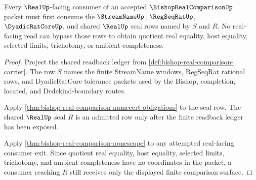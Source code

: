 \begin{theorem}
\label{thm:bishop-real-comparison-seal-exhaustion}
Every $\RealUp$-facing consumer of an accepted $\BishopRealComparisonUp$ packet must first consume the $\StreamNameUp$, $\RegSeqRatUp$, $\DyadicRatCoreUp$, and shared $\RealUp$ seal rows named by $S$ and $R$. No real-facing read can bypass those rows to obtain quotient real equality, host equality, selected limits, trichotomy, or ambient completeness.
\end{theorem}
\begin{proof}
Project the shared readback ledger from \autoref{def:bishop-real-comparison-carrier}. The row $S$ names the finite StreamName windows, RegSeqRat rational rows, and DyadicRatCore tolerance packets used by the Bishop, completion, located, and Dedekind-boundary routes.

Apply \autoref{thm:bishop-real-comparison-namecert-obligations} to the seal row. The shared $\RealUp$ seal $R$ is an admitted row only after the finite readback ledger has been exposed.

Apply \autoref{thm:bishop-real-comparison-nonescape} to any attempted real-facing consumer exit. Since quotient real equality, host equality, selected limits, trichotomy, and ambient completeness have no coordinates in the packet, a consumer reaching $R$ still receives only the displayed finite comparison surface.
\end{proof}


